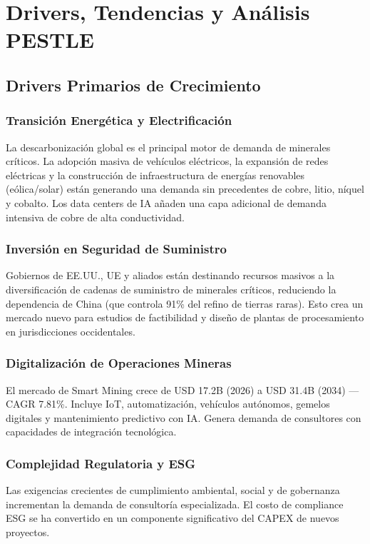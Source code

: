 \chapter{Drivers, Tendencias y Análisis PESTLE}

\section{Drivers Primarios de Crecimiento}

\subsection{Transición Energética y Electrificación}
La descarbonización global es el principal motor de demanda de minerales críticos. La adopción masiva de vehículos eléctricos, la expansión de redes eléctricas y la construcción de infraestructura de energías renovables (eólica/solar) están generando una demanda sin precedentes de cobre, litio, níquel y cobalto. Los data centers de IA añaden una capa adicional de demanda intensiva de cobre de alta conductividad.

\subsection{Inversión en Seguridad de Suministro}
Gobiernos de EE.UU., UE y aliados están destinando recursos masivos a la diversificación de cadenas de suministro de minerales críticos, reduciendo la dependencia de China (que controla 91\% del refino de tierras raras). Esto crea un mercado nuevo para estudios de factibilidad y diseño de plantas de procesamiento en jurisdicciones occidentales.

\subsection{Digitalización de Operaciones Mineras}
El mercado de Smart Mining crece de USD 17.2B (2026) a USD 31.4B (2034) — CAGR 7.81\%. Incluye IoT, automatización, vehículos autónomos, gemelos digitales y mantenimiento predictivo con IA. Genera demanda de consultores con capacidades de integración tecnológica.

\subsection{Complejidad Regulatoria y ESG}
Las exigencias crecientes de cumplimiento ambiental, social y de gobernanza incrementan la demanda de consultoría especializada. El costo de compliance ESG se ha convertido en un componente significativo del CAPEX de nuevos proyectos.

